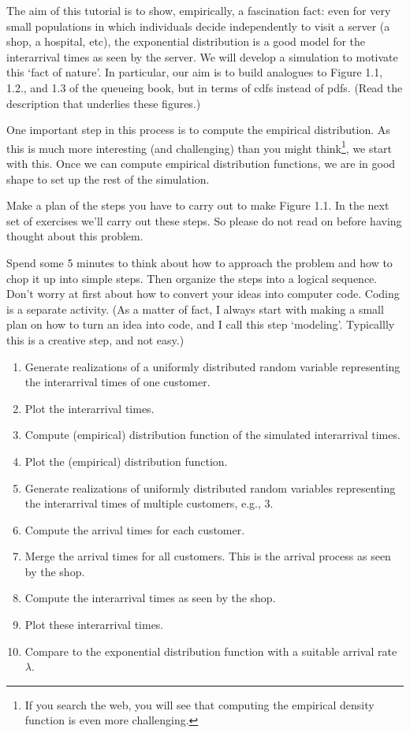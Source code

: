 \documentclass{scrartcl}
\begin{document}
The aim of this tutorial is to show, empirically, a fascination fact: even for very small populations in which individuals decide independently to visit a server (a shop, a hospital, etc),  the  exponential distribution is a good model for the interarrival times as seen by the server.  We will develop a simulation to motivate this `fact of nature'.  In particular, our aim is to build analogues to Figure 1.1, 1.2., and 1.3 of the queueing book, but in terms of cdfs instead of pdfs. (Read the description that underlies these figures.)

One important step in this process is to compute the empirical distribution. As this is much more interesting (and challenging) than you might think\footnote{If you search the web, you will see that computing the empirical density function is even more challenging.}, we start with this. Once we can compute empirical distribution functions, we are in good shape to set up the rest of the simulation. 

\begin{exercise}
  Make a plan of the steps you have to carry out to make Figure 1.1. In the next set of exercises we'll carry out these steps. So please do not read on before having thought about this problem.

  Spend some 5 minutes to think about how to approach the problem and how to chop it up into simple steps. Then organize the steps into a logical sequence. Don't worry at first about how to convert your ideas into computer code. Coding is a separate activity.  (As a matter of fact, I always start with making a small plan on how to turn an idea into code, and I call this step `modeling'. Typicallly this is a creative step, and not easy.) 

  \begin{solution}
    \begin{enumerate}
    \item Generate realizations of a uniformly distributed random variable representing the interarrival times of one customer.
    \item Plot the interarrival times.
    \item Compute (empirical) distribution function of the simulated interarrival times.
    \item Plot the (empirical) distribution function.
    \item Generate realizations of uniformly distributed random variables representing the interarrival times of multiple customers, e.g., 3. 
    \item Compute the arrival times for each customer.
    \item Merge  the arrival times for all customers. This is the arrival process as seen by the shop.
    \item Compute the interarrival times as seen by the shop.
    \item Plot these interarrival times.
    \item Compare to the exponential distribution function with a suitable arrival rate $\lambda$. 
    \end{enumerate}
  \end{solution}
\end{exercise}
\end{document}
